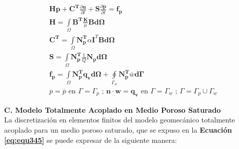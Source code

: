 \begin{ceqn} 
\begin{subequations} \label{eq:equ356} 
\begin{gather}
\mathbf{H}\mathbf{\overline{p}} + \mathbf{C^T}\frac{\partial \mathbf{\overline{u}}}{\partial t} +\mathbf{S}\frac{\partial \mathbf{\overline{p}}}{\partial t} = \mathbf{f_p}\label{eq:equ356a}\\[12pt]
\mathbf{H} = \int\limits_\Omega \mathbf{B^T}\frac{\mathbf{K}}{\mu}\mathbf{B}\mathbf{d\Omega} \label{eq:equ356b}\\[12pt]
\mathbf{C^T} =  \int\limits_\Omega \mathbf{N_p^T}\alpha\mathbf{I}^T\mathbf{B}\mathbf{d\Omega} \label{eq:equ356c}\\[12pt]
\mathbf{S} =  \int\limits_\Omega \mathbf{N_p^T}\frac{1}{Q}\mathbf{N_p}\mathbf{d\Omega} \label{eq:equ356d}\\[12pt]
\mathbf{f_p} = \int\limits_\Omega \mathbf{N_{p}^T}\mathbf{q_v}\mathbf{d\Omega} + \oint\limits_{\Gamma_{w}}  \mathbf{N_{p}^T} \overline{w} \mathbf{d\Gamma} \label{eq:equ356e}\\[12pt]
p = \overline{p} \text{  en  } \Gamma = \Gamma_p \text{ ;  } \mathbf{n}\cdot\mathbf{w}=\mathbf{q_v} \text{  en  } \Gamma = \Gamma_w \text{ ; } \Gamma = \Gamma_p \cup \Gamma_w \label{eq:equ356f}
\end{gather}  
\end{subequations} 
\end{ceqn}

\textbf{C. Modelo Totalmente Acoplado en Medio Poroso Saturado}\\
La discretización en elementos finitos del modelo geomecánico totalmente acoplado para un medio poroso saturado, que se expuso en la \textbf{Ecuación} \textbf{\ref{eq:equ345}} se puede expresar de la siguiente manera:\bigskip

